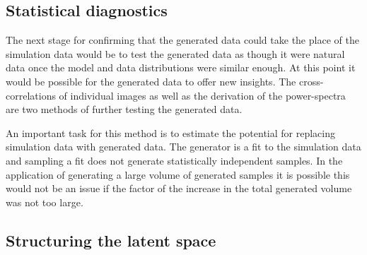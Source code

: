 \documentclass[twocolumn]{article}
\numberwithin{equation}{section}
\begin{document}


\subsection{Statistical diagnostics}

The next stage for confirming that the generated data could take the place of the simulation data would be to test the 
generated data as though it were natural data once the model and data distributions were similar enough. At this point it 
would be possible for the generated data to offer new insights. The cross-correlations of individual images as well as the 
derivation of the power-spectra are two methods of further testing the generated data.

An important task for this method is to estimate the potential for replacing simulation data with generated data. The 
generator is a fit to the simulation data and sampling a fit does not generate statistically independent samples. In the 
application of generating a large volume of generated samples it is possible this would not be an issue if the factor of 
the increase in the total generated volume was not too large.


\subsection{Structuring the latent space}
\end{document}
